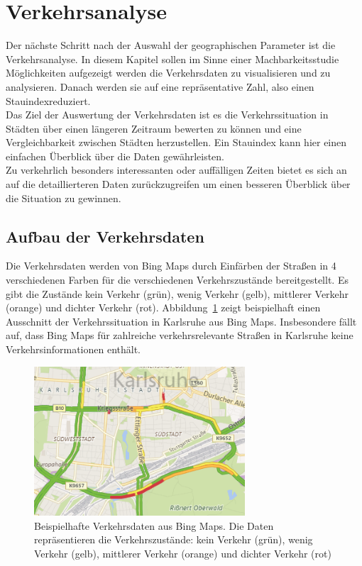 \section{Verkehrsanalyse}
Der nächste Schritt nach der Auswahl der geographischen Parameter ist die Verkehrsanalyse. In diesem Kapitel sollen im Sinne einer Machbarkeitsstudie Möglichkeiten aufgezeigt werden die Verkehrsdaten zu visualisieren und zu analysieren. Danach werden sie auf eine repräsentative Zahl, also einen \grq Stauindex\grq  reduziert.\\
Das Ziel der Auswertung der Verkehrsdaten ist es die Verkehrssituation in Städten über einen längeren Zeitraum bewerten zu können und eine Vergleichbarkeit zwischen Städten herzustellen. Ein Stauindex kann hier einen einfachen Überblick über die Daten gewährleisten.\\ Zu verkehrlich besonders interessanten oder auffälligen Zeiten bietet es sich an auf die detaillierteren Daten zurückzugreifen um einen besseren Überblick über die Situation zu gewinnen.

\subsection{Aufbau der Verkehrsdaten}
Die Verkehrsdaten werden von Bing Maps durch Einfärben der Straßen in 4 verschiedenen Farben für die verschiedenen Verkehrszustände bereitgestellt. Es gibt die Zustände kein Verkehr (grün), wenig Verkehr (gelb), mittlerer Verkehr (orange) und dichter Verkehr (rot). Abbildung~\ref{fig:farben_einfuehrung} zeigt beispielhaft einen Ausschnitt der Verkehrssituation in Karlsruhe aus Bing Maps. Insbesondere fällt auf, dass Bing Maps für zahlreiche verkehrsrelevante Straßen in Karlsruhe keine Verkehrsinformationen enthält.\\
\begin{figure}
  \centering
    \includegraphics[width=0.7\textwidth]{images/verkehr_einfuehrung.png}
    \caption{Beispielhafte Verkehrsdaten aus Bing Maps. Die Daten repräsentieren die  Verkehrszustände: kein Verkehr (grün), wenig Verkehr (gelb), mittlerer Verkehr (orange) und dichter Verkehr (rot)}
    \label{fig:farben_einfuehrung}
\end{figure}

